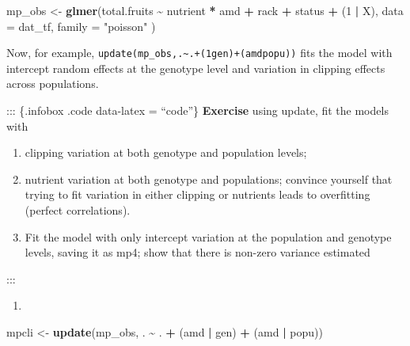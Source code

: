\documentclass[
  12pt,
]{book}
\newenvironment{Shaded}{\begin{snugshade}}{\end{snugshade}}
\newcommand{\DataTypeTok}[1]{\textcolor[rgb]{0.13,0.29,0.53}{#1}}
\newcommand{\DecValTok}[1]{\textcolor[rgb]{0.00,0.00,0.81}{#1}}
\newcommand{\KeywordTok}[1]{\textcolor[rgb]{0.13,0.29,0.53}{\textbf{#1}}}
\newcommand{\NormalTok}[1]{#1}
\newcommand{\OperatorTok}[1]{\textcolor[rgb]{0.81,0.36,0.00}{\textbf{#1}}}
\newcommand{\StringTok}[1]{\textcolor[rgb]{0.31,0.60,0.02}{#1}}
\providecommand{\tightlist}{%
  \setlength{\itemsep}{0pt}\setlength{\parskip}{0pt}}
\begin{document}
\begin{Shaded}
\begin{Highlighting}[]
\NormalTok{mp\_obs \textless{}{-}}\StringTok{ }\KeywordTok{glmer}\NormalTok{(total.fruits }\OperatorTok{\textasciitilde{}}\StringTok{ }\NormalTok{nutrient }\OperatorTok{*}\StringTok{ }\NormalTok{amd }\OperatorTok{+}
\StringTok{  }\NormalTok{rack }\OperatorTok{+}\StringTok{ }\NormalTok{status }\OperatorTok{+}
\StringTok{  }\NormalTok{(}\DecValTok{1} \OperatorTok{|}\StringTok{ }\NormalTok{X),}
\DataTypeTok{data =}\NormalTok{ dat\_tf, }\DataTypeTok{family =} \StringTok{"poisson"}
\NormalTok{)}
\end{Highlighting}
\end{Shaded}

Now, for example, \texttt{update(mp\_obs,.\textasciitilde{}.+(1\textbar{}gen)+(amd\textbar{}popu))} fits the model with intercept random effects at the genotype level and variation in clipping effects across populations.

::: \{.infobox .code data-latex = ``code''\}
\textbf{Exercise} using update, fit the models with

\begin{enumerate}
\def\labelenumi{\arabic{enumi}.}
\tightlist
\item
  clipping variation at both genotype and population levels;
\item
  nutrient variation at both genotype and populations; convince yourself that trying to fit variation in either clipping or nutrients leads to overfitting (perfect correlations).
\item
  Fit the model with only intercept variation at the population and genotype levels, saving it as mp4; show that there is non-zero variance estimated
\end{enumerate}

:::

\begin{enumerate}
\def\labelenumi{\arabic{enumi}.}
\tightlist
\item
\end{enumerate}

\begin{Shaded}
\begin{Highlighting}[]
\NormalTok{mpcli \textless{}{-}}\StringTok{ }\KeywordTok{update}\NormalTok{(mp\_obs, . }\OperatorTok{\textasciitilde{}}\StringTok{ }\NormalTok{. }\OperatorTok{+}\StringTok{ }\NormalTok{(amd }\OperatorTok{|}\StringTok{ }\NormalTok{gen) }\OperatorTok{+}\StringTok{ }\NormalTok{(amd }\OperatorTok{|}\StringTok{ }\NormalTok{popu))}
\end{Highlighting}
\end{Shaded}
\end{document}
